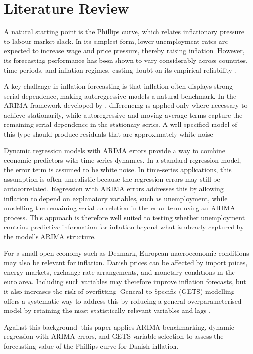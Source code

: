 


\chapter{Literature Review} \label{sec:literature_review}

A natural starting point is the Phillips curve, which relates inflationary pressure to labour-market slack. In its simplest form, lower unemployment rates are expected to increase wage and price pressure, thereby raising inflation. However, its forecasting performance has been shown to vary considerably across countries, time periods, and inflation regimes, casting doubt on its empirical reliability \parencite{stock_watson_2008}.

A key challenge in inflation forecasting is that inflation often displays strong serial dependence, making autoregressive models a natural benchmark. In the ARIMA framework developed by \textcite{box_jenkins_1976}, differencing is applied only where necessary to achieve stationarity, while autoregressive and moving average terms capture the remaining serial dependence in the stationary series. A well-specified model of this type should produce residuals that are approximately white noise.

Dynamic regression models with ARIMA errors provide a way to combine economic predictors with time-series dynamics. In a standard regression model, the error term is assumed to be white noise. In time-series applications, this assumption is often unrealistic because the regression errors may still be autocorrelated. Regression with ARIMA errors addresses this by allowing inflation to depend on explanatory variables, such as unemployment, while modelling the remaining serial correlation in the error term using an ARIMA process. This approach is therefore well suited to testing whether unemployment contains predictive information for inflation beyond what is already captured by the model's ARIMA structure.

For a small open economy such as Denmark, European macroeconomic conditions may also be relevant for inflation. Danish prices can be affected by import prices, energy markets, exchange-rate arrangements, and monetary conditions in the euro area. Including such variables may therefore improve inflation forecasts, but it also increases the risk of overfitting. General-to-Specific (GETS) modelling offers a systematic way to address this by reducing a general overparameterised model by retaining the most statistically relevant variables and lags \parencite{doornik2014}.

Against this background, this paper applies ARIMA benchmarking, dynamic 
regression with ARIMA errors, and GETS variable selection to assess the 
forecasting value of the Phillips curve for Danish inflation.
